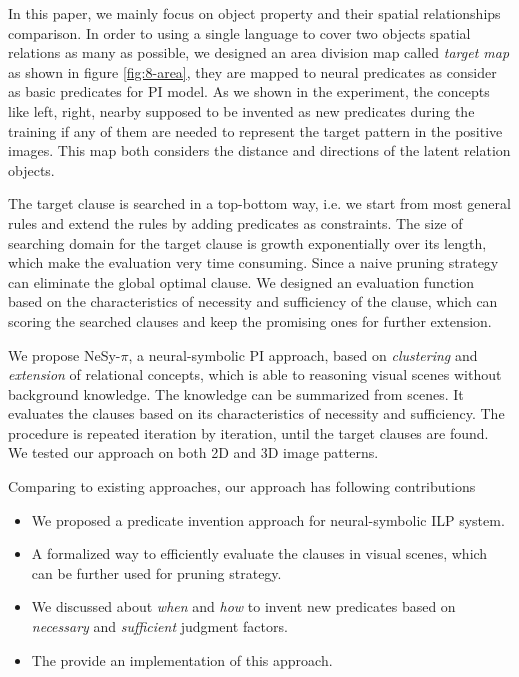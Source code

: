 \documentclass[
]{ceurart}
\begin{document}
In this paper, we mainly focus on object property and their spatial relationships comparison. In order to using a single language to cover two objects spatial relations as many as possible, we designed an area division map called \textit{target map} as shown in figure \ref{fig:8-area}, they are mapped to neural predicates as consider as basic predicates for PI model. As we shown in the experiment, the concepts like left, right, nearby supposed to be invented as new predicates during the training if any of them are needed to represent the target pattern in the positive images.  This map both considers the distance and directions of the latent relation objects. 

The target clause is searched in a top-bottom way, i.e. we start from most general rules and extend the rules by adding predicates as constraints. The size of searching domain for the target clause is growth exponentially over its length, which make the evaluation very time consuming. Since a naive pruning strategy can eliminate the global optimal clause. 
We designed an evaluation function based on the characteristics of necessity and sufficiency of the clause, which can scoring the searched clauses and keep the promising ones for further extension.

We propose NeSy-$\pi$, a neural-symbolic PI approach, based on \textit{clustering} and \textit{extension} of relational concepts, which is able to reasoning visual scenes without background knowledge. The knowledge can be summarized from scenes. It evaluates the clauses based on its characteristics of necessity and sufficiency. The procedure is repeated iteration by iteration, until the target clauses are found. We tested our approach on both 2D and 3D image patterns.

Comparing to existing approaches, our approach has following contributions

\begin{itemize}
	\item We proposed a predicate invention approach for neural-symbolic ILP system.
	\item A formalized way to efficiently evaluate the clauses in visual scenes, which can be further used for pruning strategy.
	\item We discussed about \textit{when} and \textit{how} to invent new predicates based on \textit{necessary} and \textit{sufficient} judgment factors.
	\item The provide an implementation of this approach.
	
\end{itemize}
\end{document}
